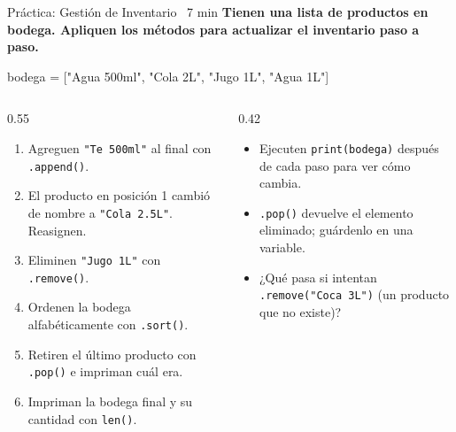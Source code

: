 \documentclass[aspectratio=169, 11pt]{beamer}
\begin{document}
\begin{frame}[fragile,shrink=25]{Práctica: Gestión de Inventario \hfill
    {\normalsize\color{arcaRed}\faClock\ 7 min}}
  \vspace{-6pt}
  {\small\color{arcaDark}\bfseries
    Tienen una lista de productos en bodega.
    Apliquen los métodos para actualizar el inventario paso a paso.}

  \vspace{4pt}
  \begin{pyblock}
bodega = ["Agua 500ml", "Cola 2L", "Jugo 1L", "Agua 1L"]
  \end{pyblock}

  \vspace{6pt}
  \begin{columns}[T]
    \begin{column}{0.55\textwidth}
      {\footnotesize
      \begin{enumerate}\setlength{\itemsep}{5pt}
        \item Agreguen \texttt{"Te 500ml"} al final
              con \texttt{.append()}.
        \item El producto en posición 1 cambió de nombre
              a \texttt{"Cola 2.5L"}. Reasignen.
        \item Eliminen \texttt{"Jugo 1L"} con
              \texttt{.remove()}.
        \item Ordenen la bodega alfabéticamente
              con \texttt{.sort()}.
        \item Retiren el último producto con
              \texttt{.pop()} e impriman cuál era.
        \item Impriman la bodega final y
              su cantidad con \texttt{len()}.
      \end{enumerate}
      }
    \end{column}

    \begin{column}{0.42\textwidth}
      {\footnotesize\color{textMuted}
      \begin{itemize}\setlength{\itemsep}{4pt}
        \item[{\color{arcaRed}\scriptsize\faLightbulb}]
          Ejecuten \texttt{print(bodega)}
          después de cada paso para ver
          cómo cambia.
        \item[{\color{arcaRed}\scriptsize\faLightbulb}]
          \texttt{.pop()} devuelve el elemento
          eliminado; guárdenlo en una variable.
        \item[{\color{arcaRed}\scriptsize\faExclamationTriangle}]
          ¿Qué pasa si intentan
          \texttt{.remove("Coca 3L")}
          (un producto que no existe)?
      \end{itemize}
      }
    \end{column}
  \end{columns}
\end{frame}
\end{document}
